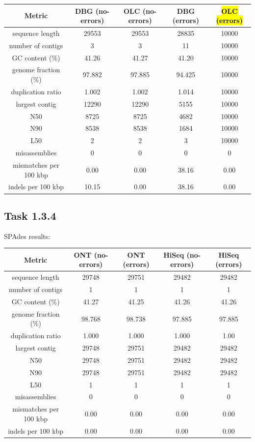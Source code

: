 \documentclass[12pt]{article}
\begin{document}
\begin{center}
\begin{tabular}{ |c|c|c||c|c| }
    \hline
    Metric & DBG (no-errors) & OLC (no-errors) & DBG (errors) & \hl{OLC (errors)} \\
    \hline
    sequence length        & 29553  & 29553  & 28835 & 10000 \\
    number of contigs      & 3      & 3      & 11 & 10000 \\
    GC content (\%)        & 41.26  & 41.27  & 41.20 & 10000 \\
    genome fraction (\%)   & 97.882 & 97.885 & 94.425 & 10000 \\
    duplication ratio      & 1.002  & 1.002  & 1.014 & 10000 \\
    largest contig         & 12290  & 12290  & 5155 & 10000 \\
    N50                    & 8725   & 8725   & 4682 & 10000 \\
    N90                    & 8538   & 8538   & 1684 & 10000 \\
    L50                    & 2      & 2      & 3 & 10000 \\
    misassemblies          & 0      & 0 & 0  & 0 \\
    mismatches per 100 kbp & 0.00   & 0.00   & 38.16 & 0.00 \\
    indels per 100 kbp     & 10.15  & 0.00   & 38.16 & 0.00 \\
    \hline
\end{tabular}
\end{center}

\subsection{Task 1.3.4}

SPAdes results:

\begin{center}
\begin{tabular}{ |c|c|c|c|c| }
    \hline
    Metric & ONT (no-errors) & ONT (errors) & HiSeq (no-errors) & HiSeq (errors) \\
    \hline
    sequence length & 29748 & 29751 & 29482 & 29482 \\
    number of contigs & 1 & 1 & 1 & 1 \\
    GC content (\%) & 41.27 & 41.25 & 41.26 & 41.26  \\
    genome fraction (\%) & 98.768 & 98.738 & 97.885  & 97.885 \\
    duplication ratio & 1.000 & 1.000 & 1.000 & 1.00 \\
    largest contig & 29748 & 29751 & 29482 & 29482 \\
    N50 & 29748 & 29751 & 29482 & 29482 \\
    N90 & 29748 & 29751 & 29482 & 29482 \\
    L50 & 1 & 1 & 1 & 1 \\
    misassemblies & 0 & 0 & 0 & 0 \\
    mismatches per 100 kbp & 0.00 & 0.00 & 0.00 & 0.00 \\
    indels per 100 kbp & 0.00 & 0.00 & 0.00 & 0.00 \\
    \hline
\end{tabular}
\end{center}
\end{document}
